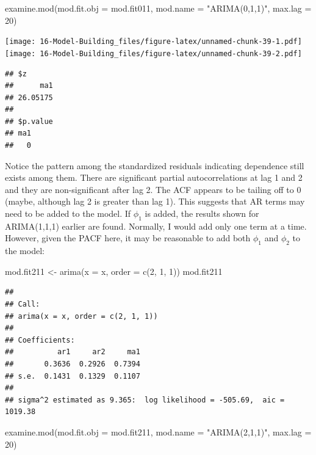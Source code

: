 \documentclass[
]{book}
\newenvironment{Shaded}{\begin{snugshade}}{\end{snugshade}}
\newcommand{\AttributeTok}[1]{\textcolor[rgb]{0.77,0.63,0.00}{#1}}
\newcommand{\DecValTok}[1]{\textcolor[rgb]{0.00,0.00,0.81}{#1}}
\newcommand{\FunctionTok}[1]{\textcolor[rgb]{0.00,0.00,0.00}{#1}}
\newcommand{\NormalTok}[1]{#1}
\newcommand{\OtherTok}[1]{\textcolor[rgb]{0.56,0.35,0.01}{#1}}
\newcommand{\StringTok}[1]{\textcolor[rgb]{0.31,0.60,0.02}{#1}}
\theoremstyle{definition}
\theoremstyle{definition}
\theoremstyle{definition}
\theoremstyle{definition}
\theoremstyle{remark}
\begin{document}
\begin{Shaded}
\begin{Highlighting}[]
\FunctionTok{examine.mod}\NormalTok{(}\AttributeTok{mod.fit.obj =}\NormalTok{ mod.fit011, }\AttributeTok{mod.name =} 
    \StringTok{"ARIMA(0,1,1)"}\NormalTok{, }\AttributeTok{max.lag =} \DecValTok{20}\NormalTok{)}
\end{Highlighting}
\end{Shaded}

\texttt{[image: 16-Model-Building\_files/figure-latex/unnamed-chunk-39-1.pdf]} \texttt{[image: 16-Model-Building\_files/figure-latex/unnamed-chunk-39-2.pdf]}

\begin{verbatim}
## $z
##      ma1 
## 26.05175 
## 
## $p.value
## ma1 
##   0
\end{verbatim}

Notice the pattern among the standardized residuals indicating dependence still exists among them. There are significant partial autocorrelations at lag 1 and 2 and they are non-significant after lag 2. The ACF appears to be tailing off to 0 (maybe, although lag 2 is greater than lag 1). This suggests that AR terms may need to be added to the model. If \(\phi_1\) is added, the results shown for ARIMA(1,1,1) earlier are found. Normally, I would add only one term at a time. However, given the PACF here, it may be reasonable to add both \(\phi_1\) and \(\phi_2\) to the model:

\begin{Shaded}
\begin{Highlighting}[]
\NormalTok{mod.fit211 }\OtherTok{\textless{}{-}} \FunctionTok{arima}\NormalTok{(}\AttributeTok{x =}\NormalTok{ x, }\AttributeTok{order =} \FunctionTok{c}\NormalTok{(}\DecValTok{2}\NormalTok{, }\DecValTok{1}\NormalTok{, }\DecValTok{1}\NormalTok{))}
\NormalTok{mod.fit211}
\end{Highlighting}
\end{Shaded}

\begin{verbatim}
## 
## Call:
## arima(x = x, order = c(2, 1, 1))
## 
## Coefficients:
##          ar1     ar2     ma1
##       0.3636  0.2926  0.7394
## s.e.  0.1431  0.1329  0.1107
## 
## sigma^2 estimated as 9.365:  log likelihood = -505.69,  aic = 1019.38
\end{verbatim}

\begin{Shaded}
\begin{Highlighting}[]
\FunctionTok{examine.mod}\NormalTok{(}\AttributeTok{mod.fit.obj =}\NormalTok{ mod.fit211, }\AttributeTok{mod.name =} 
    \StringTok{"ARIMA(2,1,1)"}\NormalTok{, }\AttributeTok{max.lag =} \DecValTok{20}\NormalTok{)}
\end{Highlighting}
\end{Shaded}
\end{document}
